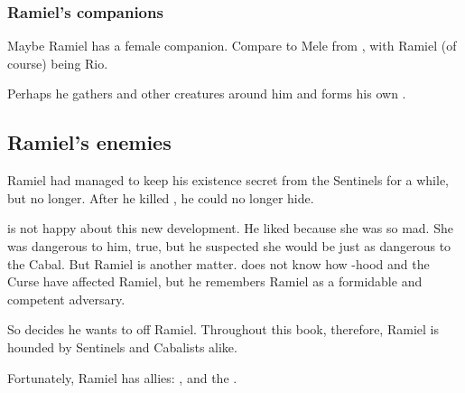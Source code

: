 






\subsubsection{Ramiel's companions}
Maybe Ramiel has a female companion. 
Compare to Mele from \emph{\JuukenSentaiGekiranger}, with Ramiel (of course) being Rio. 

Perhaps he gathers \vorcanths{} and other creatures around him and forms his own \Rinjuuken. 









\subsection{Ramiel's enemies}
Ramiel had managed to keep his existence secret from the Sentinels for a while, but no longer. 
After he killed \Shiaraid, he could no longer hide. 

\Secherdamon{} is not happy about this new development. 
He liked \Shiaraid{} because she was so mad. 
She was dangerous to him, true, but he suspected she would be just as dangerous to the Cabal. 
But Ramiel is another matter. 
\Secherdamon{} does not know how \malach-hood and the Curse have affected Ramiel, but he remembers Ramiel as a formidable and competent adversary. 

So \Secherdamon{} decides he wants to off Ramiel. 
Throughout this book, therefore, Ramiel is hounded by Sentinels and Cabalists alike. 

Fortunately, Ramiel has allies: 
\Cishiel, \Azraid{} and the \vorcanths. 





